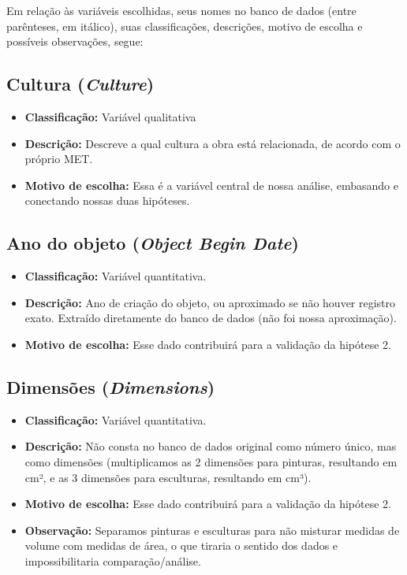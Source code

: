 \documentclass[11pt,a4paper]{article}
\begin{document}
Em relação às variáveis escolhidas, seus nomes no banco de dados (entre parênteses, em itálico), suas classificações, descrições, motivo de escolha e possíveis observações, segue:

\subsection*{Cultura (\textit{Culture})}
\begin{itemize}
    \item \textbf{Classificação:} Variável qualitativa
    \item \textbf{Descrição:} Descreve a qual cultura a obra está relacionada, de acordo com o próprio MET.
    \item \textbf{Motivo de escolha:} Essa é a variável central de nossa análise, embasando e conectando nossas duas hipóteses.
\end{itemize}

\subsection*{Ano do objeto (\textit{Object Begin Date})}
\begin{itemize}
    \item \textbf{Classificação:} Variável quantitativa.
    \item \textbf{Descrição:} Ano de criação do objeto, ou aproximado se não houver registro exato. Extraído diretamente do banco de dados (não foi nossa aproximação).
    \item \textbf{Motivo de escolha:} Esse dado contribuirá para a validação da hipótese 2.
\end{itemize}

\subsection*{Dimensões (\textit{Dimensions})}
\begin{itemize}
    \item \textbf{Classificação:} Variável quantitativa.
    \item \textbf{Descrição:} Não consta no banco de dados original como número único, mas como dimensões (multiplicamos as 2 dimensões para pinturas, resultando em cm², e as 3 dimensões para esculturas, resultando em cm³).
    \item \textbf{Motivo de escolha:}  Esse dado contribuirá para a validação da hipótese 2.
    \item \textbf{Observação:} Separamos pinturas e esculturas para não misturar medidas de volume com medidas de área, o que tiraria o sentido dos dados e impossibilitaria comparação/análise.
\end{itemize}
\end{document}
